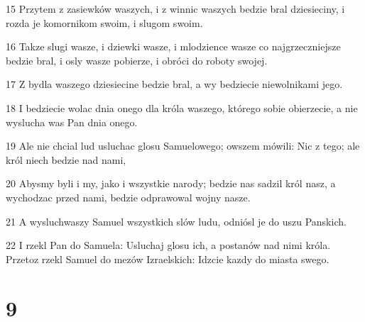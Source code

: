 \par 15 Przytem z zasiewków waszych, i z winnic waszych bedzie bral dziesieciny, i rozda je komornikom swoim, i slugom swoim.
\par 16 Takze slugi wasze, i dziewki wasze, i mlodzience wasze co najgrzeczniejsze bedzie bral, i osly wasze pobierze, i obróci do roboty swojej.
\par 17 Z bydla waszego dziesiecine bedzie bral, a wy bedziecie niewolnikami jego.
\par 18 I bedziecie wolac dnia onego dla króla waszego, którego sobie obierzecie, a nie wyslucha was Pan dnia onego.
\par 19 Ale nie chcial lud usluchac glosu Samuelowego; owszem mówili: Nic z tego; ale król niech bedzie nad nami,
\par 20 Abysmy byli i my, jako i wszystkie narody; bedzie nas sadzil król nasz, a wychodzac przed nami, bedzie odprawowal wojny nasze.
\par 21 A wysluchwaszy Samuel wszystkich slów ludu, odniósl je do uszu Panskich.
\par 22 I rzekl Pan do Samuela: Usluchaj glosu ich, a postanów nad nimi króla. Przetoz rzekl Samuel do mezów Izraelskich: Idzcie kazdy do miasta swego.

\chapter{9}

